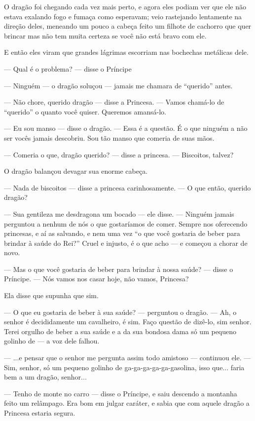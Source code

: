 O dragão foi chegando cada vez mais perto, e agora eles podiam ver que
ele não estava exalando fogo e fumaça como esperavam; veio rastejando
lentamente na direção deles, meneando um pouco a cabeça feito um
filhote de cachorro que quer brincar mas não tem muita certeza se
você não está bravo com ele.

E então eles viram que grandes lágrimas escorriam nas bochechas
metálicas dele.

— Qual é o problema? — disse o Príncipe

— Ninguém — o dragão soluçou — jamais me chamara de “querido” antes.

— Não chore, querido dragão — disse a Princesa. — Vamos chamá-lo de
“querido” o quanto você quiser. Queremos amansá-lo.

— Eu sou manso — disse o dragão. — Essa é a questão. É o que ninguém a
não ser vocês jamais descobriu. Sou tão manso que comeria de suas
mãos.

— Comeria o que, dragão querido? — disse a princesa. — Biscoitos,
talvez?

O dragão balançou devagar sua enorme cabeça.

— Nada de biscoitos — disse a princesa carinhosamente. — O que então,
querido dragão?

— Sua gentileza me desdragona um bocado — ele disse. — Ninguém jamais
perguntou a nenhum de nós o que gostaríamos de comer. Sempre nos
oferecendo princesas, e aí as salvando, e nem uma vez “o que você
gostaria de beber para brindar à saúde do Rei?” Cruel e injusto, é o
que acho — e começou a chorar de novo.

— Mas o que você gostaria de beber para brindar à nossa saúde? — disse
o Príncipe. — Nós vamos nos casar hoje, não vamos, Princesa?

Ela disse que supunha que sim.

— O que eu gostaria de beber à sua saúde? — perguntou o dragão. — Ah,
o senhor é decididamente um cavalheiro, é sim. Faço questão de
dizê-lo, sim senhor. Terei orgulho de beber a sua saúde e a da sua
bondosa dama só um pequeno golinho de — a voz dele falhou. 

— ...e pensar que o senhor me pergunta assim todo amistoso — continuou
ele. — Sim, senhor, só um pequeno golinho de ga-ga-ga-ga-ga-gasolina,
isso que... faria bem a um dragão, senhor...

— Tenho de monte no carro — disse o Príncipe, e saiu descendo a
montanha feito um relâmpago. Era bom em julgar caráter, e sabia que
com aquele dragão a Princesa estaria segura.

